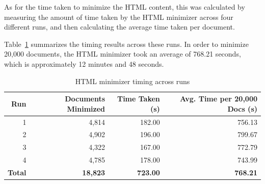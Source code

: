 As for the time taken to minimize the HTML content, this was calculated by measuring the amount of time taken by the HTML minimizer across four different runs, and then calculating the average time taken per document.

Table~\ref{tab:html-minimizer-runtime} summarizes the timing results across these runs.
In order to minimize 20,000 documents, the HTML minimizer took an average of 768.21 seconds, which is approximately 12 minutes and 48 seconds.

\begin{table}[H]
    \centering
    \small
    \begin{tabular}{rrrr}
        \toprule
        \textbf{Run} & \textbf{Documents Minimized} & \textbf{Time Taken (s)} & \textbf{Avg. Time per 20,000 Docs (s)} \\
        \midrule
        1 & 4,814 & 182.00 & 756.13 \\
        2 & 4,902 & 196.00 & 799.67 \\
        3 & 4,322 & 167.00 & 772.79 \\
        4 & 4,785 & 178.00 & 743.99 \\
        \midrule
        \textbf{Total} & \textbf{18,823} & \textbf{723.00} & \textbf{768.21} \\
        \bottomrule
    \end{tabular}
    \caption{HTML minimizer timing across runs}
    \label{tab:html-minimizer-runtime}
\end{table}
